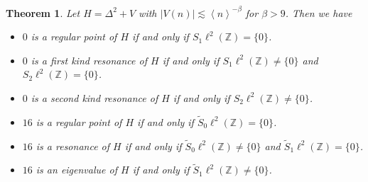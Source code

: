 \documentclass[10pt,a4paper]{amsart}
\newtheorem{theorem}[definition]{Theorem}
\newcommand\Z{\mathbb{Z}}
\numberwithin{equation}{section}
\begin{document}
\setcounter{section}{1}
\setcounter{equation}{19}
\setcounter{definition}{6}
\begin{theorem}\label{relation space and resonance types}
 Let $H=\Delta^2+V$ with $|V(n)|\lesssim \left<n\right>^{-\beta}$ for $\beta>9$. Then we have
\begin{itemize}
\item[{\rm(i)}] $0$ is a regular point of $H$ if and only if $S_1\ell^2(\Z)=\{0\}$.
\item[{\rm(ii)}] $0$ is a first kind resonance of $H$ if and only if $S_1\ell^2(\Z)\neq\{0\}$ and $S_2\ell^2(\Z)=\{0\}$.
\item[{\rm(iii)}] $0$ is a second kind resonance of $H$ if and only if $S_2\ell^2(\Z)\neq\{0\}$.

\item[{\rm(iv)}] $16$ is a regular point of $H$ if and only if $\widetilde{S}_0\ell^2(\Z)=\{0\}$.
\item[{\rm(v)}] $16$ is a resonance of $H$ if and only if $\widetilde{S}_0\ell^2(\Z)\neq\{0\}$ and $\widetilde{S}_{1}\ell^2(\Z)=\{0\}$.
\item[{\rm(vi)}] $16$ is an eigenvalue of $H$ if and only if $\widetilde{S}_{1}\ell^2(\Z)\neq\{0\}$.
\end{itemize}
\end{theorem}
\end{document}
